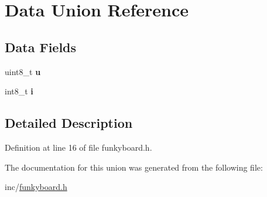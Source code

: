 \hypertarget{unionData}{}\section{Data Union Reference}
\label{unionData}
\subsection*{Data Fields}
\begin{DoxyCompactItemize}
\item 
\mbox{\label{unionData_a6d913633423729c5773303b505873597}} 
uint8\+\_\+t {\bfseries u}
\item 
\mbox{\label{unionData_a611d229e5820bb45c641d1e27be9eaa7}} 
int8\+\_\+t {\bfseries i}
\end{DoxyCompactItemize}


\subsection{Detailed Description}


Definition at line 16 of file funkyboard.\+h.



The documentation for this union was generated from the following file\+:\begin{DoxyCompactItemize}
\item 
inc/\hyperlink{funkyboard_8h}{funkyboard.\+h}\end{DoxyCompactItemize}
